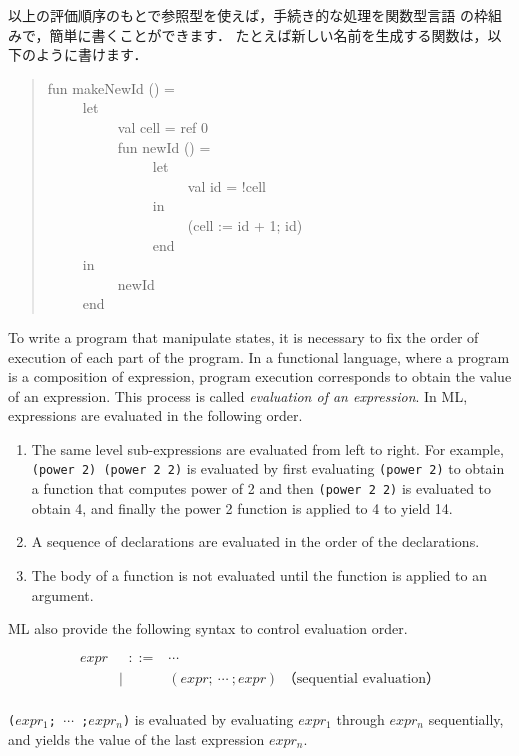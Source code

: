 \documentclass{jbook}
\newcommand{\myem}{\ \ \ \ \  }
\begin{document}
	以上の評価順序のもとで参照型を使えば，手続き的な処理を関数型言語
の枠組みで，簡単に書くことができます．
	たとえば新しい名前を生成する関数は，以下のように書けます．
\begin{tt}
\begin{quote}
fun makeNewId () =\\
\myem let\\
\myem\myem val cell = ref 0\\
\myem\myem fun newId () =\\
\myem\myem\myem let\\
\myem\myem\myem\myem val id = !cell\\
\myem\myem\myem in\\
\myem\myem\myem\myem (cell := id + 1; id)\\
\myem\myem\myem end\\
\myem in\\
\myem\myem newId\\
\myem end
\end{quote}
\end{tt}
\else%
	To write a program that manipulate states, it is necessary to
fix the order of execution of each part of the program.
	In a functional language, where a program is a composition of
expression, program execution corresponds to obtain the value of an
expression.
	This process is called {\em evaluation of an expression}.
	In ML, expressions are evaluated in the following order.
\begin{enumerate}
\item The same level sub-expressions are evaluated from left to right. 
	For example, {\tt (power 2) (power 2 2)} is evaluated by
first evaluating {\tt (power 2)} to obtain a function that computes
power of 2 and then {\tt (power 2 2)} is evaluated to obtain 4, and
finally the power 2 function is applied to 4 to yield 
14.
\item A sequence of declarations are evaluated in the order of the
declarations.
\item The body of a function is not evaluated until the function is
applied to an argument.
\end{enumerate}
	ML also provide the following syntax to control evaluation order.
\begin{tt}
\begin{eqnarray*}
expr &\mbox{\ \ }::=& \cdots\\
     &|& (expr;{\ }\cdots{\ };expr)   \mbox{\ \ \ \ （sequential evaluation）} \\
\end{eqnarray*}
\end{tt}
	{\tt ($expr_1$;{\ }$\cdots${\ };$expr_n$)} is evaluated by 
evaluating $expr_1$ through $expr_n$ sequentially, and yields the value
of the last expression $expr_n$.
\end{document}
